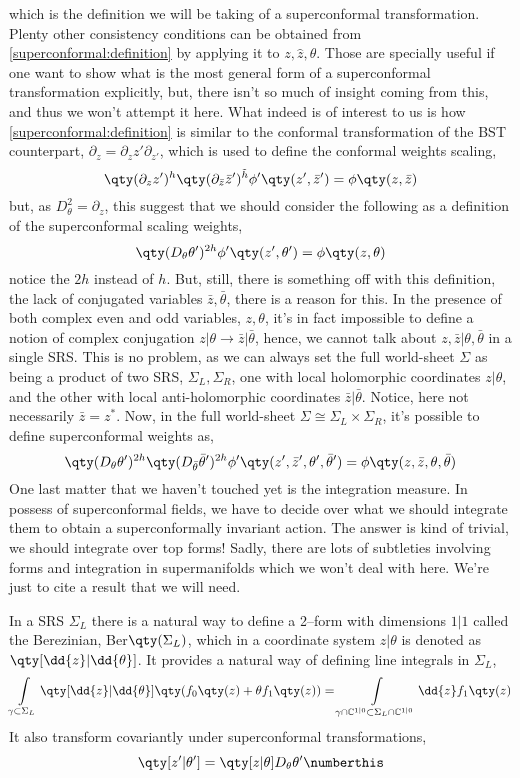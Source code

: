which is the definition we will be taking of a superconformal transformation. Plenty other consistency conditions can be 
obtained from \cref{superconformal:definition} by applying it to $z,\hat z,\theta$. Those are specially useful if one want to 
show what is the most general form of a superconformal transformation explicitly, but, there isn't so much of insight coming 
from this, and thus we won't attempt it here. What indeed is of interest to us is how \cref{superconformal:definition} is 
similar to the conformal transformation of the BST counterpart, $\partial_z=\partial_z z'\partial_{z'}$, which is used to define the conformal weights scaling,
\[\qty(\partial_z z')^{h}\qty(\partial_{\bar z}{\bar z}')^{\tilde h}{\phi}'\qty(z',{\bar z}')=\phi\qty(z,\bar z)\]
but, as $D^2_\theta=\partial_z$, this suggest that we should consider the following as a definition of the superconformal scaling 
weights, \[\qty(D_\theta \theta')^{2h}\phi'\qty(z',\theta')=\phi\qty(z,\theta)\] notice the $2h$ instead of $h$. But, still, there 
is something off with this definition, the lack of conjugated variables $\bar z,\bar\theta$, there is a reason for this. 
In the presence of both complex even and odd variables, $z,\theta$, it's in fact impossible to define a notion of 
complex conjugation $z|\theta\rightarrow\bar z|\bar \theta$, hence, we cannot talk about $z,\bar z|\theta,\bar\theta$ 
in a single SRS. This is no problem, as we can always set the full world-sheet $\Sigma$ as being a product of two SRS, 
$\Sigma_L,\Sigma_R$, one with local holomorphic coordinates $z|\theta$, and the other with local anti-holomorphic 
coordinates $\bar z|\bar \theta$. Notice, here not necessarily $\bar z=z^\ast$. Now, in the full world-sheet $\Sigma\cong\Sigma_L\times \Sigma_R$, 
it's possible to define superconformal weights as, \[\qty(D_\theta \theta')^{2h}\qty(D_{\bar\theta} {\bar\theta}')^{2h}\phi'\qty(z',{\bar z}',\theta',{\bar\theta}')=\phi\qty(z,{\bar z},\theta,{\bar\theta})\] 
One last matter that we haven't touched yet is the integration measure. In possess of superconformal fields, we have to 
decide over what we should integrate them to obtain a superconformally invariant action. The answer is kind of 
trivial, we should integrate over top forms! Sadly, there are lots of subtleties involving forms and integration in 
supermanifolds which we won't deal with here. We're just to cite a result that we will need.
\begin{lemma}\label{berezinian}
    In a SRS $\Sigma_L$ there is a natural way to define a 2--form with dimensions $1|1$ called the Berezinian, Ber$\qty(\Sigma_L)$, which in 
    a coordinate system $z|\theta$ is denoted as $\qty[\dd{z}|\dd{\theta}]$. It provides a natural way of defining line 
    integrals in $\Sigma_L$,
    \[\int\limits_{\gamma\subset\Sigma_L}\qty[\dd{z}|\dd{\theta}]\qty(f_0\qty(z)+\theta f_1\qty(z))=\int\limits_{\gamma\cap\mathbb C^{1|0}\subset\Sigma_L\cap\mathbb C^{1|0}}\dd{z}f_1\qty(z)\]
    It also transform covariantly under superconformal transformations, \[\qty[z'|\theta']=\qty[z|\theta]D_\theta\theta'\numberthis\label{measuretransformation}\]
\end{lemma}

